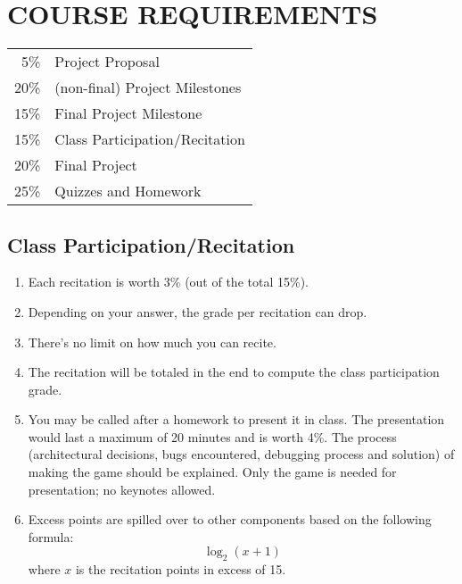\documentclass[10pt]{article}
\begin{document}
\section{COURSE REQUIREMENTS}
\begin{center}
\begin{tabular}{rl}
5\% & Project Proposal\\
20\% & (non-final) Project Milestones\\
15\% & Final Project Milestone\\
15\% & Class Participation/Recitation\\
20\% & Final Project\\
25\% & Quizzes and Homework\\
\end{tabular}
\end{center}

\subsection{Class Participation/Recitation}
\begin{enumerate}[noitemsep]
\item Each recitation is worth 3\% (out of the total 15\%).
\item Depending on your answer, the grade per recitation can drop.
\item There's no limit on how much you can recite.
\item The recitation will be totaled in the end to compute the class participation grade.
\item You may be called after a homework to present it in class. The presentation would last a maximum of 20 minutes and is worth 4\%. The process (architectural decisions, bugs encountered, debugging process and solution) of making the game should be explained. Only the game is needed for presentation; no keynotes allowed.
\item Excess points are spilled over to other components based on the following formula:
$$
\log_2(x + 1)
$$
where $x$ is the recitation points in excess of 15.
\end{enumerate}
\end{document}
